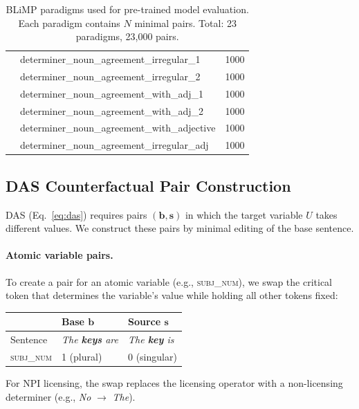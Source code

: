 \documentclass[11pt]{article}
\begin{document}
\begin{table}[t]
\begin{tabular}{@{}llr@{}}
 & determiner\_noun\_agreement\_irregular\_1 & 1000 \\
 & determiner\_noun\_agreement\_irregular\_2 & 1000 \\
 & determiner\_noun\_agreement\_with\_adj\_1 & 1000 \\
 & determiner\_noun\_agreement\_with\_adj\_2 & 1000 \\
 & determiner\_noun\_agreement\_with\_adjective & 1000 \\
 & determiner\_noun\_agreement\_irregular\_adj & 1000 \\
\bottomrule
\end{tabular}
\caption{BLiMP paradigms used for pre-trained model evaluation. Each paradigm contains $N$ minimal pairs. Total: 23 paradigms, 23{,}000 pairs.}
\label{tab:blimp-paradigms}
\end{table}

\subsection{DAS Counterfactual Pair Construction}
\label{app:das-pairs}

DAS (Eq.~\ref{eq:das}) requires pairs $(\mathbf{b}, \mathbf{s})$ in which the target variable $U$ takes different values.
We construct these pairs by minimal editing of the base sentence.

\paragraph{Atomic variable pairs.}
To create a pair for an atomic variable (e.g., \textsc{subj\_num}), we swap the critical token that determines the variable's value while holding all other tokens fixed:
\begin{center}\scriptsize
\begin{tabular}{@{}lll@{}}
\toprule
& \textbf{Base} $\mathbf{b}$ & \textbf{Source} $\mathbf{s}$ \\
\midrule
Sentence & \textit{The \textbf{keys} are} & \textit{The \textbf{key} is} \\
\textsc{subj\_num} & 1 (plural) & 0 (singular) \\
\bottomrule
\end{tabular}
\end{center}
For NPI licensing, the swap replaces the licensing operator with a non-licensing determiner (e.g., \textit{No} $\to$ \textit{The}).
\end{document}
